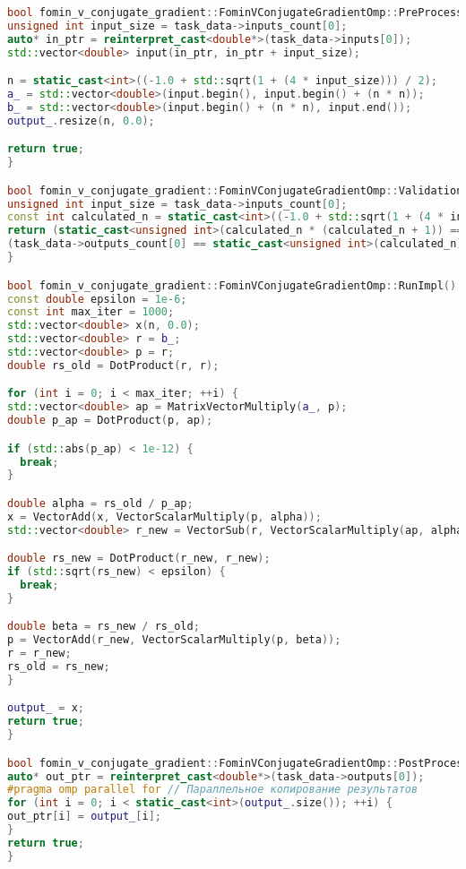 \documentclass[12pt]{article}
\begin{document}
\begin{lstlisting}[language=C++]
bool fomin_v_conjugate_gradient::FominVConjugateGradientOmp::PreProcessingImpl() {
unsigned int input_size = task_data->inputs_count[0];
auto* in_ptr = reinterpret_cast<double*>(task_data->inputs[0]);
std::vector<double> input(in_ptr, in_ptr + input_size);

n = static_cast<int>((-1.0 + std::sqrt(1 + (4 * input_size))) / 2);
a_ = std::vector<double>(input.begin(), input.begin() + (n * n));
b_ = std::vector<double>(input.begin() + (n * n), input.end());
output_.resize(n, 0.0);

return true;
}

bool fomin_v_conjugate_gradient::FominVConjugateGradientOmp::ValidationImpl() {
unsigned int input_size = task_data->inputs_count[0];
const int calculated_n = static_cast<int>((-1.0 + std::sqrt(1 + (4 * input_size))) / 2);
return (static_cast<unsigned int>(calculated_n * (calculated_n + 1)) == input_size) &&
(task_data->outputs_count[0] == static_cast<unsigned int>(calculated_n));
}

bool fomin_v_conjugate_gradient::FominVConjugateGradientOmp::RunImpl() {
const double epsilon = 1e-6;
const int max_iter = 1000;
std::vector<double> x(n, 0.0);
std::vector<double> r = b_;
std::vector<double> p = r;
double rs_old = DotProduct(r, r);

for (int i = 0; i < max_iter; ++i) {
std::vector<double> ap = MatrixVectorMultiply(a_, p);
double p_ap = DotProduct(p, ap);

if (std::abs(p_ap) < 1e-12) {
  break;
}

double alpha = rs_old / p_ap;
x = VectorAdd(x, VectorScalarMultiply(p, alpha));
std::vector<double> r_new = VectorSub(r, VectorScalarMultiply(ap, alpha));

double rs_new = DotProduct(r_new, r_new);
if (std::sqrt(rs_new) < epsilon) {
  break;
}

double beta = rs_new / rs_old;
p = VectorAdd(r_new, VectorScalarMultiply(p, beta));
r = r_new;
rs_old = rs_new;
}

output_ = x;
return true;
}

bool fomin_v_conjugate_gradient::FominVConjugateGradientOmp::PostProcessingImpl() {
auto* out_ptr = reinterpret_cast<double*>(task_data->outputs[0]);
#pragma omp parallel for // Параллельное копирование результатов
for (int i = 0; i < static_cast<int>(output_.size()); ++i) {
out_ptr[i] = output_[i];
}
return true;
}
\end{lstlisting}
\newpage
\begin{lstlisting}[language=C++]

\end{lstlisting}
\end{document}
